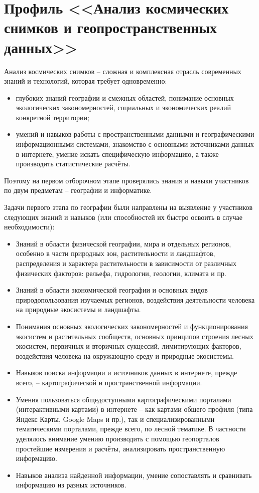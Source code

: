 

\chapter{Профиль <<Анализ космических снимков и геопространственных данных>>}

Анализ космических снимков – сложная и комплексная отрасль современных знаний и технологий, которая требует одновременно:
\begin{itemize}
    \item глубоких знаний географии и смежных областей, понимание основных экологических закономерностей, социальных и экономических реалий конкретной территории; 
    \item умений и навыков работы с пространственными данными и географическими информационными системами, знакомство с основными источниками данных в интернете, умение искать специфическую информацию, а также производить статистические расчёты.
\end{itemize}

Поэтому на первом отборочном этапе проверялись знания и навыки участников по двум предметам – географии и информатике. 

Задачи первого этапа по географии были направлены на выявление у участников следующих знаний и навыков (или способностей их быстро освоить в случае необходимости):
\begin{itemize}
    \item Знаний в области физической географии, мира и отдельных регионов, особенно в части природных зон, растительности и ландшафтов, распределения и характера растительности в зависимости от различных физических факторов: рельефа, гидрологии, геологии, климата и пр.
    \item Знаний в области экономической географии и основных видов природопользования изучаемых регионов, воздействия деятельности человека на природные экосистемы и ландшафты.
    \item Понимания основных экологических закономерностей и функционирования экосистем и растительных сообществ, основных принципов строения лесных экосистем, первичных и вторичных сукцессий, лимитирующих факторов, воздействия человека на окружающую среду и природные экосистемы.
    \item Навыков поиска информации и источников данных в интернете, прежде всего, – картографической и пространственной информации.
    \item Умения пользоваться общедоступными картографическими порталами (интерактивными картами) в интернете – как картами общего профиля (типа Яндекс Карты, Google Maps и пр.), так и специализированными тематическими порталами, прежде всего, по лесной тематике. В частности уделялось внимание умению производить с помощью геопорталов простейшие измерения и расчёты, анализировать пространственную информацию.
    \item Навыков анализа найденной информации, умение сопоставлять и сравнивать информацию из разных источников.
\end{itemize}

